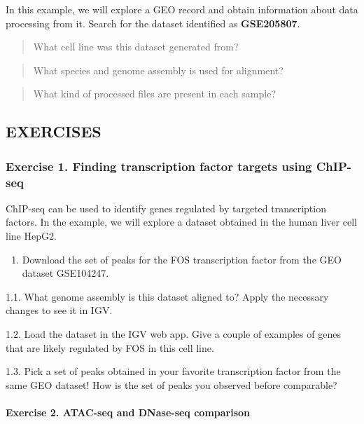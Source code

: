 \documentclass[
]{book}
\providecommand{\tightlist}{%
  \setlength{\itemsep}{0pt}\setlength{\parskip}{0pt}}
\begin{document}
In this example, we will explore a GEO record and obtain information about data processing from it.
Search for the dataset identified as \textbf{GSE205807}.

\begin{quote}
What cell line was this dataset generated from?
\end{quote}

\begin{quote}
What species and genome assembly is used for alignment?
\end{quote}

\begin{quote}
What kind of processed files are present in each sample?
\end{quote}

\hypertarget{exercises-4}{%
\subsection{EXERCISES}\label{exercises-4}}

\hypertarget{exercise-1.-finding-transcription-factor-targets-using-chip-seq}{%
\subsubsection{Exercise 1. Finding transcription factor targets using ChIP-seq}\label{exercise-1.-finding-transcription-factor-targets-using-chip-seq}}

ChIP-seq can be used to identify genes regulated by targeted transcription factors. In the example, we will explore a dataset obtained in the human liver cell line HepG2.

\begin{enumerate}
\def\labelenumi{\arabic{enumi}.}
\tightlist
\item
  Download the set of peaks for the FOS transcription factor from the GEO dataset GSE104247.
\end{enumerate}

1.1. What genome assembly is this dataset aligned to? Apply the necessary changes to see it in IGV.

1.2. Load the dataset in the IGV web app. Give a couple of examples of genes that are likely regulated by FOS in this cell line.

1.3. Pick a set of peaks obtained in your favorite transcription factor from the same GEO dataset! How is the set of peaks you observed before comparable?

\hypertarget{exercise-2.-atac-seq-and-dnase-seq-comparison}{%
\paragraph{Exercise 2. ATAC-seq and DNase-seq comparison}\label{exercise-2.-atac-seq-and-dnase-seq-comparison}}
\end{document}
